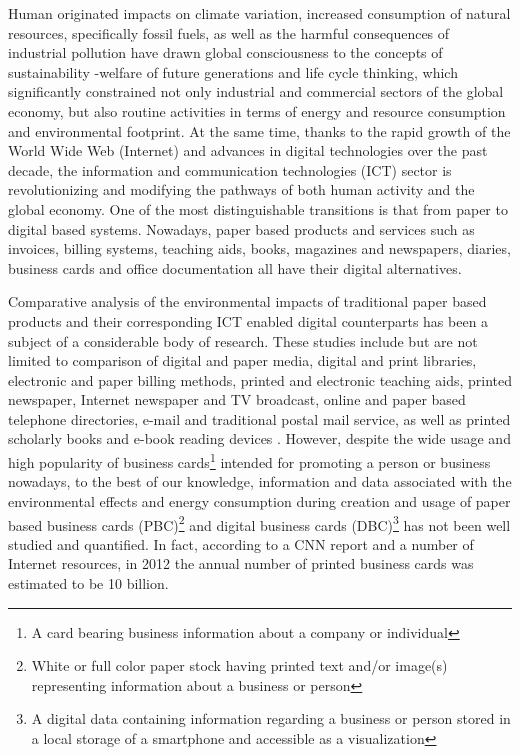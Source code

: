 \documentclass[conference]{IEEEtran}
\begin{document}
Human originated impacts on climate variation, increased consumption of natural resources, specifically fossil fuels, as well as the harmful consequences of industrial pollution have drawn global consciousness to the concepts of sustainability -welfare of future generations and life cycle thinking, which significantly constrained not only industrial and commercial sectors of the global economy, but also routine activities in terms of energy and resource consumption and environmental footprint. At the same time, thanks to the rapid growth of the World Wide Web (Internet) and advances in digital technologies over the past decade, the information and communication technologies (ICT) sector is revolutionizing and modifying the pathways of both human activity and the global economy. One of the most distinguishable transitions is that from paper to digital based systems. Nowadays, paper based products and services such as invoices, billing systems, teaching aids, books, magazines and newspapers, diaries, business cards and office documentation all have their digital alternatives.

Comparative analysis of the environmental impacts of traditional paper based products and their corresponding ICT enabled digital counterparts has been a subject of a  considerable body of research. These studies include but are not limited to comparison of digital and paper media, digital and print libraries, electronic and paper billing methods, printed and electronic teaching aids, printed newspaper, Internet newspaper and TV broadcast, online and paper based telephone directories, e-mail and traditional postal mail service, as well as printed scholarly books and e-book reading devices \cite{Bull201410, 6360455, enroth2009, zurkirch2000, kozak2003,hischier2003multifunctional }. However, despite the wide usage and high popularity of business cards\footnote{A card bearing business information about a company or individual} intended for promoting a person or business nowadays, to the best of our knowledge, information and data associated with the environmental effects and energy consumption during creation and usage of paper based business cards (PBC)\footnote{White or full color paper stock having printed text and/or image(s) representing information about a business or person} and digital business cards (DBC)\footnote{A digital data containing information regarding a business or person stored in a local storage of a smartphone and accessible as a visualization} has not been well studied and quantified. In fact, according to a CNN report and a number of Internet resources, in 2012 the annual number of printed business cards was estimated to be 10 billion.
\end{document}
